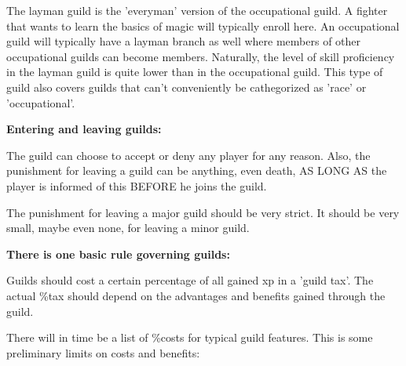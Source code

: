 The layman guild is the 'everyman' version of the occupational guild.
A fighter that wants to learn the basics of magic will typically enroll
here. An occupational guild will typically have a layman branch as well
where members of other occupational guilds can become members. Naturally,
the level of skill proficiency in the layman guild is quite lower than
in the occupational guild. This type of guild also covers guilds that
can't conveniently be cathegorized as 'race' or 'occupational'.

{\bf Entering and leaving guilds:}


The guild can choose to accept or deny any player for any reason.
Also, the punishment for leaving a guild can be anything, even death,
AS LONG AS the player is informed of this BEFORE he joins the guild.

The punishment for leaving a major guild should be very strict. It
should be very small, maybe even none, for leaving a minor guild.

{\bf There is one basic rule governing guilds:}


Guilds should cost a certain percentage of all gained xp
in a 'guild tax'. The actual \%tax should depend on the
advantages and benefits gained through the guild. 

There will in time be a list of \%costs for typical guild features. This is
some preliminary limits on costs and benefits:

